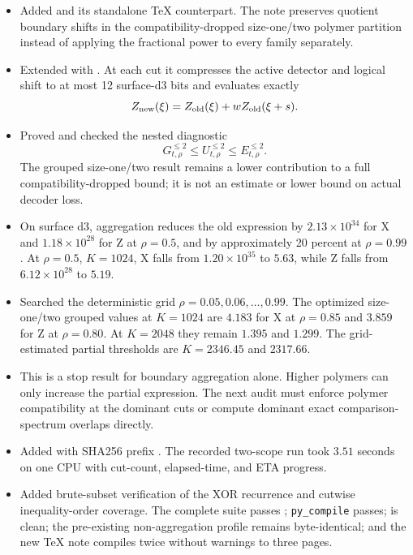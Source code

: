 \begin{itemize}
\item Added
\texttt{} and its standalone
TeX counterpart.  The note preserves quotient boundary shifts in the
compatibility-dropped size-one/two polymer partition instead of applying the
fractional power to every family separately.
\item Extended \texttt{} with
\texttt{}.  At each cut it compresses
the active detector and logical shift to at most 12 surface-d3 bits and
evaluates exactly
\[
 Z_{\rm new}(\xi)=Z_{\rm old}(\xi)+wZ_{\rm old}(\xi+s).
\]
\item Proved and checked the nested diagnostic
\[
 G_{t,\rho}^{\le2}
 \le U_{t,\rho}^{\le2}
 \le E_{t,\rho}^{\le2}.
\]
The grouped size-one/two result remains a lower contribution to a full
compatibility-dropped bound; it is not an estimate or lower bound on actual
decoder loss.
\item On surface d3, aggregation reduces the old expression by
\(2.13\times10^{34}\) for X and \(1.18\times10^{28}\) for Z at
\(\rho=0.5\), and by approximately 20 percent at \(\rho=0.99\).  At
\(\rho=0.5\), \(K=1024\), X falls from \(1.20\times10^{35}\) to \(5.63\),
while Z falls from \(6.12\times10^{28}\) to \(5.19\).
\item Searched the deterministic grid
\(\rho=0.05,0.06,\ldots,0.99\).  The optimized size-one/two grouped values at
\(K=1024\) are \(4.183\) for X at \(\rho=0.85\) and \(3.859\) for Z at
\(\rho=0.80\).  At \(K=2048\) they remain \(1.395\) and \(1.299\).  The
grid-estimated partial thresholds are \(K=2346.45\) and \(2317.66\).
\item This is a stop result for boundary aggregation alone.  Higher polymers
can only increase the partial expression.  The next audit must enforce
polymer compatibility at the dominant cuts or compute dominant exact
comparison-spectrum overlaps directly.
\item Added
\texttt{}
with SHA256 prefix \texttt{}.  The recorded two-scope
run took \(3.51\) seconds on one CPU with cut-count, elapsed-time, and ETA
progress.
\item Added brute-subset verification of the XOR recurrence and cutwise
inequality-order coverage.  The complete suite passes
\texttt{}; \texttt{py\_compile} passes;
\texttt{} is clean; the pre-existing
non-aggregation profile remains byte-identical; and the new TeX note compiles
twice without warnings to three pages.
\end{itemize}

